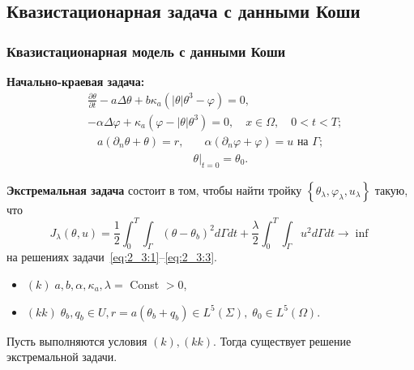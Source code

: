 \subsection{Квазистационарная задача с данными Коши}\label{subsec:qst_koshi}
\begin{frame}
    \frametitle{Квазистационарная модель с данными Коши}
    \textbf{Начально-краевая задача:}
    \begin{equation}
        \label{eq:2_3:1}
        \begin{split}
            & \frac{\partial \theta}{\partial t} - a \Delta \theta
            + b \kappa_{a} \left(|\theta| \theta^{3}-\varphi\right) = 0,\\
            & - \alpha \Delta \varphi
            + \kappa_{a} \left(\varphi-|\theta| \theta^{3}\right) = 0,
            \quad x \in \Omega, \quad 0 < t < T;
        \end{split}
    \end{equation}
    \begin{align}
        a \left(\partial_{n} \theta+\theta\right)=r,
        & \quad \alpha\left(\partial_{n} \varphi
        + \varphi\right) = u \text { на } \Gamma;  \label{eq:2_3:2}\\
        & \left.\theta\right|_{t=0} = \theta_{0}. \label{eq:2_3:3}
    \end{align}


    \textbf{Экстремальная задача} состоит в том, чтобы найти тройку
    $\left\{\theta_{\lambda}, \varphi_{\lambda}, u_{\lambda}\right\}$ такую, что
    \begin{equation}
        \label{eq:2_3:4}
        J_{\lambda}(\theta, u)=\frac{1}{2} \int_{0}^{T}
        \int_{\Gamma}\left(\theta-\theta_{b}\right)^{2} d \Gamma d t+\frac{\lambda}{2}
        \int_{0}^{T} \int_{\Gamma} u^{2} d \Gamma d t \rightarrow \inf
    \end{equation}
    на решениях задачи~\eqref{eq:2_3:1}--\eqref{eq:2_3:3}.
    \begin{itemize}
        \item $(k)\; a, b, \alpha, \kappa_{a}, \lambda=$ Const $>0$,
        \item $(kk)\; \theta_{b}, q_{b} \in U, r=a\left(\theta_{b}+q_{b}\right)
        \in L^{5}(\Sigma), \; \theta_{0} \in L^{5}(\Omega)$.
    \end{itemize}

    \begin{theorem}[2.6]
        \label{th:2_3:1}
        Пусть выполняются условия $(k), (kk)$.
        Тогда существует решение экстремальной задачи.
    \end{theorem}
\end{frame}

